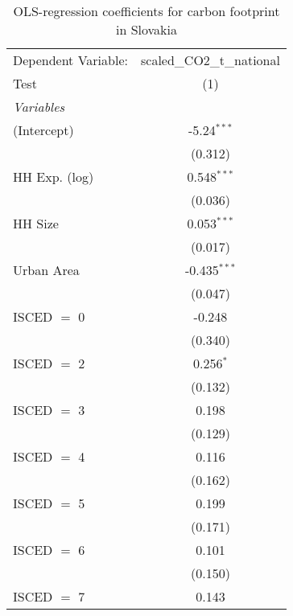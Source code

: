 
\begin{table}[htbp!]
   \centering
   \small
   \begin{adjustbox}{width = 1\textwidth, max height = 0.95\textheight, center}
      \begin{threeparttable}[b]
         \caption{\label{tab:OLS_2_SVK} OLS-regression coefficients for carbon footprint in Slovakia}
         \begin{tabular}{lc}
            \tabularnewline \midrule \midrule
            Dependent Variable: & scaled\_CO2\_t\_national\\     
            Test                & (1)\\  
            \midrule
            \emph{Variables}\\
            (Intercept)         & -5.24$^{***}$\\   
                                & (0.312)\\   
            HH Exp. (log)       & 0.548$^{***}$\\   
                                & (0.036)\\   
            HH Size             & 0.053$^{***}$\\   
                                & (0.017)\\   
            Urban Area          & -0.435$^{***}$\\   
                                & (0.047)\\   
            ISCED $=$ 0         & -0.248\\   
                                & (0.340)\\   
            ISCED $=$ 2         & 0.256$^{*}$\\   
                                & (0.132)\\   
            ISCED $=$ 3         & 0.198\\   
                                & (0.129)\\   
            ISCED $=$ 4         & 0.116\\   
                                & (0.162)\\   
            ISCED $=$ 5         & 0.199\\   
                                & (0.171)\\   
            ISCED $=$ 6         & 0.101\\   
                                & (0.150)\\   
            ISCED $=$ 7         & 0.143\\   

\end{tabular}
\end{threeparttable}
\end{adjustbox}
\end{table}
